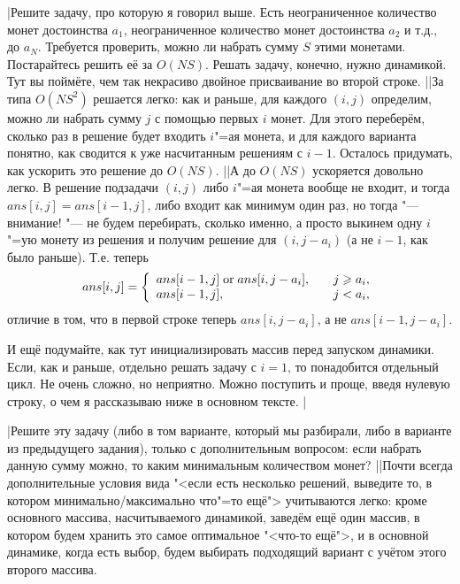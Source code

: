 \task|Решите задачу, про которую я говорил выше. Есть неограниченное количество монет достоинства 
$a_1$, неограниченное количество монет достоинства $a_2$ и т.д., до $a_N$. Требуется проверить, 
можно ли набрать сумму $S$ этими монетами. Постарайтесь решить её за $O(NS)$. Решать задачу, конечно, 
нужно динамикой. Тут вы поймёте, чем так некрасиво двойное присваивание во второй строке.%
||За типа $O(NS^2)$ решается легко: как и раньше, для каждого $(i,j)$ определим, можно ли набрать сумму $j$ с помощью первых $i$ монет. Для этого переберём, сколько раз в решение будет входить $i$"=ая монета, и для каждого варианта понятно, как сводится к уже насчитанным решениям с $i-1$. Осталось придумать, как ускорить это решение до $O(NS)$.
||А до $O(NS)$ ускоряется довольно легко. В решение подзадачи $(i,j)$ либо $i$"=ая монета вообще не входит, и тогда $ans[i,j]=ans[i-1,j]$, либо входит как минимум один раз, но тогда "--- внимание! "--- не будем перебирать, сколько именно, а просто выкинем одну $i$"=ую монету из решения и получим решение для $(i,j-a_i)$ (а не $i-1$, как было раньше). Т.е. теперь 
$$
ans[i,j]=\left\{
\begin{array}{ll}
ans[i-1,j] \mathrel{\mathrm{or}} ans[i,j-a_i],&\quad j\geqslant a_i,\\
ans[i-1,j],&\quad j<a_i,
\end{array}\right.
$$
отличие в том, что в первой строке теперь $ans[i,j-a_i]$, а не $ans[i-1,j-a_i]$.

И ещё подумайте, как тут инициализировать массив перед запуском динамики. Если, как и раньше, отдельно решать задачу с $i=1$, то понадобится отдельный цикл. Не очень сложно, но неприятно. Можно поступить и проще, введя нулевую строку, о чем я рассказываю ниже в основном тексте.
|\label{multi_coins}

\task|Решите эту задачу (либо в том варианте, который мы разбирали, либо в варианте из предыдущего задания), только с дополнительным вопросом: если набрать данную сумму можно, то каким минимальным количеством монет?
||Почти всегда дополнительные условия вида "<если есть несколько решений, выведите то, в котором минимально/максимально что"=то ещё"> учитываются легко: кроме основного массива, насчитываемого динамикой, заведём ещё один массив, в котором будем хранить это самое оптимальное "<что-то ещё">, и в основной динамике, когда есть выбор, будем выбирать подходящий вариант с учётом этого второго массива.


